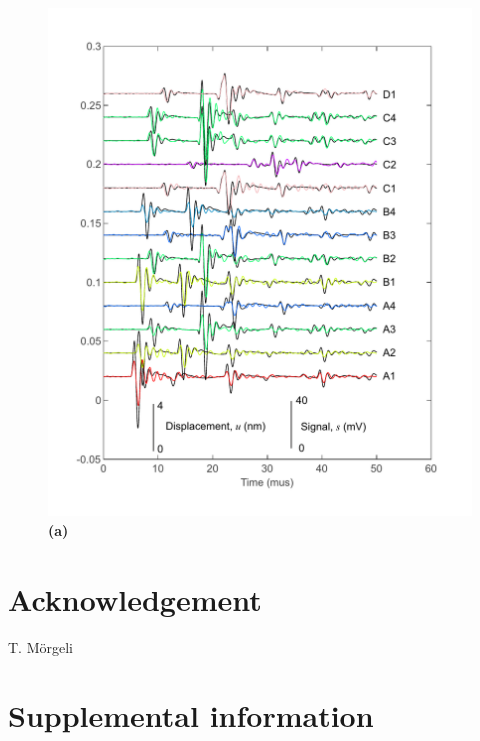 \documentclass[preprint,3p, 11pt,authoryear]{elsarticle}
\begin{document}
\begin{figure}[ht]
     	\centering
\includegraphics[scale= 1]{FIG10.pdf} 
\caption{\textbf{(a)}  }
	\label{fig10} 
\end{figure}




\clearpage

\section*{Acknowledgement}
T. M\"orgeli
 

 



\section*{Supplemental information}
\end{document}
